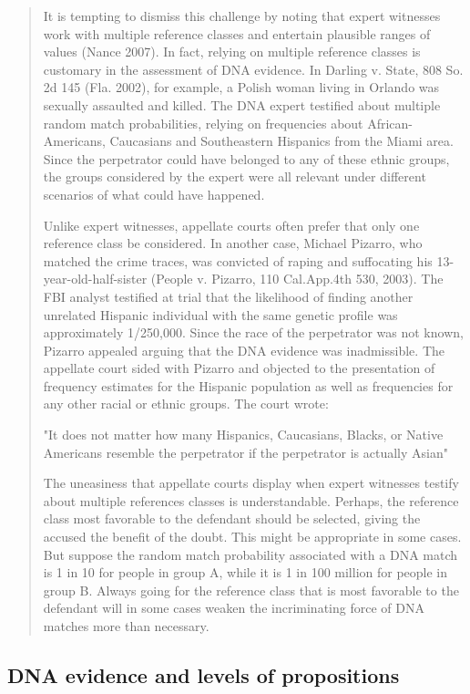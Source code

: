 \documentclass[
  10pt,
  dvipsnames,enabledeprecatedfontcommands]{scrartcl}
\begin{document}
\begin{quote}
It is tempting to dismiss this challenge by noting that expert witnesses work with multiple reference classes and entertain plausible ranges of values (Nance 2007). In fact, relying on multiple reference classes is customary in the assessment of DNA evidence. In Darling v. State, 808 So. 2d 145 (Fla. 2002), for example, a Polish woman living in Orlando was sexually assaulted and killed. The DNA expert testified about multiple random match probabilities, relying on frequencies about African-Americans, Caucasians and Southeastern Hispanics from the Miami area. Since the perpetrator could have belonged to any of these ethnic groups, the groups considered by the expert were all relevant under different scenarios of what could have happened.

Unlike expert witnesses, appellate courts often prefer that only one reference class be considered. In another case, Michael Pizarro, who matched the crime traces, was convicted of raping and suffocating his 13-year-old-half-sister (People v. Pizarro, 110 Cal.App.4th 530, 2003). The FBI analyst testified at trial that the likelihood of finding another unrelated Hispanic individual with the same genetic profile was approximately  1/250,000. Since the race of the perpetrator was not known, Pizarro appealed arguing that the DNA evidence was inadmissible. The appellate court sided with Pizarro and objected to the presentation of frequency estimates for the Hispanic population as well as frequencies for any other racial or ethnic groups. The court wrote:

"It does not matter how many Hispanics, Caucasians, Blacks, or Native Americans resemble the perpetrator if the perpetrator is actually Asian"

The uneasiness that appellate courts display when expert witnesses testify about multiple references classes is understandable. Perhaps, the reference class most favorable to the defendant should be selected, giving the accused the benefit of the doubt. This might be appropriate in some cases. But suppose the random match probability associated with a DNA match is 1 in 10 for people in group A, while it is 1 in 100 million for people in group B. Always going for the reference class that is most favorable to the defendant will in some cases weaken the incriminating force of DNA matches more than necessary.
\end{quote}

\hypertarget{dna-evidence-and-levels-of-propositions}{%
\subsection{DNA evidence and levels of
propositions}\label{dna-evidence-and-levels-of-propositions}}
\end{document}
